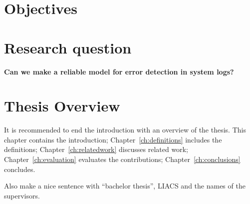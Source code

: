 \section{Objectives}


\section{Research question}

\textbf{Can we make a reliable model for error detection in system logs?}

 
\section{Thesis Overview}
It is recommended to end the introduction with an overview of the thesis. This chapter contains the introduction; Chapter~\ref{ch:definitions} includes the definitions; Chapter~\ref{ch:relatedwork} discusses related work; Chapter~\ref{ch:evaluation} evaluates the contributions; Chapter~\ref{ch:conclusions} concludes.

Also make a nice sentence with ``bachelor thesis'', LIACS and the names of the supervisors.

